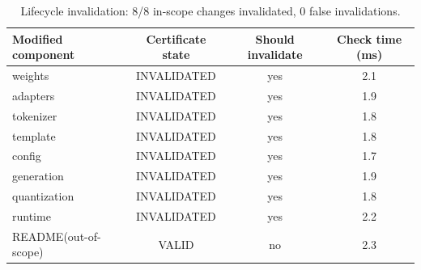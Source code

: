 \begin{table}[t]
\centering
\caption{Lifecycle invalidation: 8/8 in-scope changes invalidated, 0 false invalidations.}
\label{tab:invalidation}
\footnotesize
\begin{tabular}{lccc}
\toprule
Modified component & Certificate state & Should invalidate & Check time (ms) \\
\midrule
weights & INVALIDATED & yes & 2.1 \\
adapters & INVALIDATED & yes & 1.9 \\
tokenizer & INVALIDATED & yes & 1.8 \\
template & INVALIDATED & yes & 1.8 \\
config & INVALIDATED & yes & 1.7 \\
generation & INVALIDATED & yes & 1.9 \\
quantization & INVALIDATED & yes & 1.8 \\
runtime & INVALIDATED & yes & 2.2 \\
README(out-of-scope) & VALID & no & 2.3 \\
\bottomrule
\end{tabular}
\end{table}